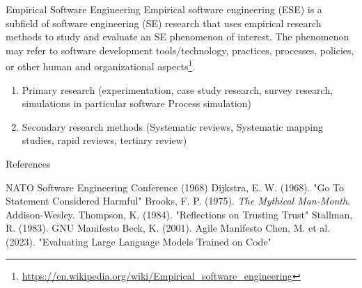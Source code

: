 \documentclass{beamer}
\begin{document}
\begin{frame}[t]{Empirical Software Engineering}
Empirical software engineering (ESE) is a subfield of software engineering (SE) research that uses empirical research methods to study and evaluate an SE phenomenon of interest. The phenomenon may refer to software development tools/technology, practices, processes, policies, or other human and organizational aspects\footnote{\url{https://en.wikipedia.org/wiki/Empirical_software_engineering}}. %

\begin{enumerate}
    \item Primary research (experimentation, case study research, survey research, simulations in particular software Process simulation)
    \item Secondary research methods (Systematic reviews, Systematic mapping studies, rapid reviews, tertiary review)
\end{enumerate}
\end{frame}
\begin{frame}[t]{References}
\begin{thebibliography}{10}
 NATO Software Engineering Conference (1968)
 Dijkstra, E. W. (1968). "Go To Statement Considered Harmful"
 Brooks, F. P. (1975). \textit{The Mythical Man-Month}. Addison-Wesley. %
 Thompson, K. (1984). "Reflections on Trusting Trust"
 Stallman, R. (1983). GNU Manifesto
 Beck, K. (2001). Agile Manifesto
 Chen, M. et al. (2023). "Evaluating Large Language Models Trained on Code"
\end{thebibliography}
\end{frame}
\end{document}
